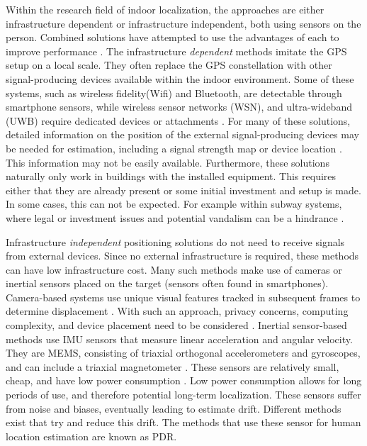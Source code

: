 Within the research field of indoor localization, the approaches are either infrastructure dependent or infrastructure independent, both using sensors on the person. Combined solutions have attempted to use the advantages of each to improve performance \cite{Gu2019, Correa2017}. The infrastructure \textit{dependent} methods imitate the GPS setup on a local scale. They often replace the GPS constellation with other signal-producing devices available within the indoor environment. Some of these systems, such as wireless fidelity(Wifi) and Bluetooth, are detectable through smartphone sensors, while wireless sensor networks (WSN), and ultra-wideband (UWB) require dedicated devices or attachments \cite{Wu2019,Jackermeier2018,Davidson2017}. For many of these solutions, detailed information on the position of the external signal-producing devices may be needed for estimation, including a signal strength map or device location \cite{Jackermeier2018,Shang2015}. This information may not be easily available. Furthermore, these solutions naturally only work in buildings with the installed equipment. This requires either that they are already present or some initial investment and setup is made. In some cases, this can not be expected. For example within subway systems, where legal or investment issues and potential vandalism can be a hindrance \cite{Torok2014}. \par
%

Infrastructure \textit{independent} positioning solutions do not need to receive signals from external devices. Since no external infrastructure is required, these methods can have low infrastructure cost. Many such methods make use of cameras or inertial sensors placed on the target (sensors often found in smartphones). Camera-based systems use unique visual features tracked in subsequent frames to determine displacement \cite{Gu2019}. With such an approach, privacy concerns, computing complexity, and device placement need to be considered \cite{Gu2019}. Inertial sensor-based methods use \ac{IMU} sensors that measure linear acceleration and angular velocity. They are \ac{MEMS},  consisting of triaxial orthogonal accelerometers and gyroscopes, and can include a triaxial magnetometer \cite{Yang2014}. These sensors are relatively small, cheap, and have low power consumption \cite{Olsson2016}. Low power consumption allows for long periods of use, and therefore potential long-term localization. These sensors suffer from noise and biases, eventually leading to estimate drift. Different methods exist that try and reduce this drift. The methods that use these sensor for human location estimation are known as \ac{PDR}. \par

